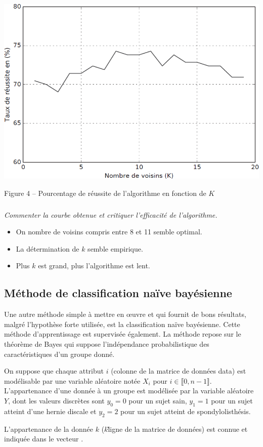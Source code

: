 \begin{center}
\includegraphics[width=.5\textwidth]{images/fig_04}

Figure 4 -- Pourcentage de réussite de l’algorithme en fonction de $K$
\end{center}
\fi

\subparagraph{}\textit{Commenter la courbe obtenue et critiquer l’efficacité de l’algorithme.}
\ifprof
\begin{corrige}
\begin{itemize}
\item On nombre de voisins compris entre 8 et 11 semble optimal.
\item La détermination de $k$ semble empirique.
\item Plus $k$ est grand, plus l'algorithme est lent.
\end{itemize}
\end{corrige}
\else
\fi

\subsection{Méthode de classification naïve bayésienne}
\ifprof
\else
Une autre méthode simple à mettre en œuvre et qui fournit de bons résultats, malgré l’hypothèse
forte utilisée, est la classification naïve bayésienne. Cette méthode d’apprentissage est supervisée
également. La méthode repose sur le théorème de Bayes qui suppose l’indépendance probabilistique
des caractéristiques d’un groupe donné.

On suppose que chaque attribut $i$ (colonne de la matrice de données data) est modélisable par une
variable aléatoire notée $X_i$ pour $i \in \llbracket 0,n-1 \rrbracket$. L’appartenance d’une donnée à un groupe est modélisée par la variable aléatoire $Y$, dont les valeurs discrètes sont $y_0 = 0$ pour un sujet sain, $y_1 = 1$ pour un
sujet atteint d’une hernie discale et $y_2 = 2$ pour un sujet atteint de spondylolisthésis.

L’appartenance de la donnée $k$ ($k$\ieme \~ ligne de la matrice de données) est connue et indiquée dans le vecteur .


